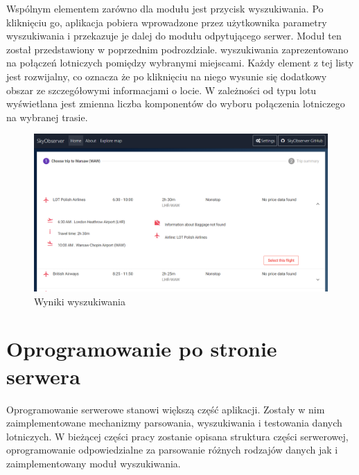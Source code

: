 \documentclass[12pt, twoside]{report}
\begin{document}
Wspólnym elementem zarówno dla  modułu   jest przycisk wyszukiwania. Po kliknięciu go, aplikacja pobiera wprowadzone przez użytkownika parametry wyszukiwania i przekazuje je dalej do modułu odpytującego serwer. Moduł ten został przedstawiony w poprzednim podrozdziale.  wyszukiwania zaprezentowano na    połączeń lotniczych pomiędzy wybranymi miejscami. Każdy element z tej listy jest rozwijalny, co oznacza że po kliknięciu na niego wysunie się dodatkowy obszar ze szczegółowymi informacjami o locie. W zależności od typu lotu wyświetlana jest zmienna liczba komponentów do wyboru połączenia lotniczego na wybranej trasie.
\begin{figure}[!ht]
\centering
\includegraphics[scale=0.40, keepaspectratio]{result_component.png}
\caption{Wyniki wyszukiwania}
\label{fig:result_component}
\end{figure}

\section{Oprogramowanie po stronie serwera}
Oprogramowanie serwerowe stanowi większą część  aplikacji. Zostały w nim zaimplementowane mechanizmy parsowania, wyszukiwania i testowania danych lotniczych.     W bieżącej części pracy zostanie opisana struktura części serwerowej, oprogramowanie odpowiedzialne za parsowanie różnych rodzajów danych\add{,} jak i zaimplementowany moduł wyszukiwania.
\end{document}
